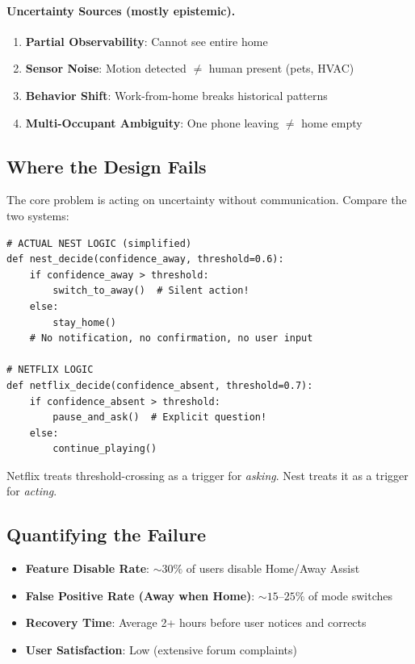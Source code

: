 \paragraph{Uncertainty Sources (mostly epistemic).}
\begin{enumerate}
    \item \textbf{Partial Observability}: Cannot see entire home
    \item \textbf{Sensor Noise}: Motion detected $\neq$ human present (pets, HVAC)
    \item \textbf{Behavior Shift}: Work-from-home breaks historical patterns
    \item \textbf{Multi-Occupant Ambiguity}: One phone leaving $\neq$ home empty
\end{enumerate}

\subsection{Where the Design Fails}

The core problem is acting on uncertainty without communication. Compare the two systems:

\begin{lstlisting}[style=python, caption={Actual Nest logic (simplified) vs.\ Netflix logic}]
# ACTUAL NEST LOGIC (simplified)
def nest_decide(confidence_away, threshold=0.6):
    if confidence_away > threshold:
        switch_to_away()  # Silent action!
    else:
        stay_home()
    # No notification, no confirmation, no user input

# NETFLIX LOGIC
def netflix_decide(confidence_absent, threshold=0.7):
    if confidence_absent > threshold:
        pause_and_ask()  # Explicit question!
    else:
        continue_playing()
\end{lstlisting}

\begin{cautionbox}
Netflix treats threshold-crossing as a trigger for \emph{asking}. Nest treats it as a trigger for \emph{acting}.
\end{cautionbox}

\subsection{Quantifying the Failure}

\begin{technote}
\begin{itemize}
    \item \textbf{Feature Disable Rate}: ${\sim}30\%$ of users disable Home/Away Assist
    \item \textbf{False Positive Rate (Away when Home)}: ${\sim}15$--$25\%$ of mode switches
    \item \textbf{Recovery Time}: Average 2+ hours before user notices and corrects
    \item \textbf{User Satisfaction}: Low (extensive forum complaints)
\end{itemize}
\end{technote}

